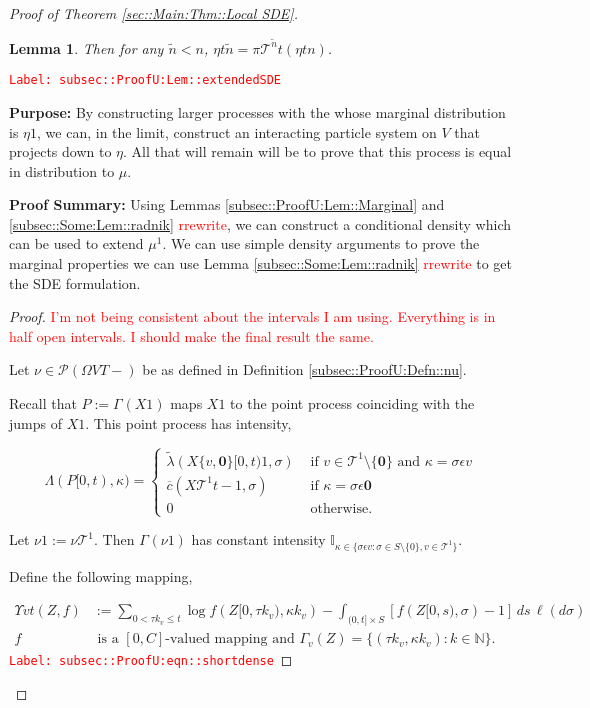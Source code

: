\documentclass[12pt]{article}
\newcommand{\mb}{\mathbb}
\newcommand{\mc}{\mathcal}
\newcommand{\ov}{\overline}
\newcommand{\te}{\text}
\newcommand{\ep}{\epsilon}
\newcommand{\tr}{\textcolor{red}}
\newcommand{\labe}[1]{\tr{\texttt{Label: #1}}}
\newcommand{\purpose}{\textbf{Purpose: }}
\newcommand{\pfsum}{\textbf{Proof Summary: }}
\newcommand{\ind}{\hspace{24pt}}
\newcommand{\defeq}{:=}								%
\newcommand{\pmsr}{\mc{P}}							%
\renewcommand{\root}{\mathbf{0}}				%
\renewcommand{\v}{v}							%
\renewcommand{\S}{S}							%
\newcommand{\s}{\sigma}							%
\newcommand{\ev}{\ep}							%
\newcommand{\T}{T}								%
\renewcommand{\t}{t}							%
\newcommand{\proj}{\pi}							%
\renewcommand{\tt}{s}							%
\newcommand{\X}{X}								%
\newcommand{\const}{C}							%
\newcommand{\IGrg}{\ov{c}}						%
\newcommand{\tree}{\mc{T}}						%
\newcommand{\sln}[1]{^{#1}}						%
\newcommand{\Sm}{\ell}							%
\newcommand{\alt}[1]{\widetilde{#1}}			%
\newcommand{\m}{\mu}							%
\newcommand{\mm}{\nu}							%
\newcommand{\mmm}{\eta}							%
\newcommand{\XXX}{Z}							%
\newcommand{\rt}{\tau}							%
\renewcommand{\it}{k}							%
\newcommand{\pmap}[1]{\Gamma_{#1}}				%
\renewcommand{\mark}{\kappa}					%
\newcommand{\rp}{P}								%
\newcommand{\ratee}{\Lambda}					%
\newcommand{\crate}{\alt{\lambda}}				%
\newcommand{\ds}{\Upsilon}						%
\newtheorem{lem}[thms]{Lemma}
\begin{document}
\begin{proof}[Proof of Theorem \ref{sec::Main:Thm::Local SDE}]
\begin{lem}
Then for any \(\alt{n} < n\), \(\mmm{}{\t}{\alt{n}} = \proj{\tree\sln{\alt{n}}}{\t}(\mmm{}{\t}{n})\).
\label{subsec::ProofU:Lem::extendedSDE}
\end{lem}
\labe{subsec::ProofU:Lem::extendedSDE}

\purpose By constructing larger processes with the whose marginal distribution is \(\mmm{}{}{1}\), we can, in the limit, construct an interacting particle system on \(V\) that projects down to \(\mmm{}{}{}\). All that will remain will be to prove that this process is equal in distribution to \(\m{}{}{}\).

\pfsum Using Lemmas \ref{subsec::ProofU:Lem::Marginal} and \ref{subsec::Some:Lem::radnik} \tr{rrewrite}, we can construct a conditional density which can be used to extend \(\mu\sln{1}\). We can use simple density arguments to prove the marginal properties we can use Lemma \ref{subsec::Some:Lem::radnik} \tr{rrewrite} to get the SDE formulation.

\begin{proof}
\tr{I'm not being consistent about the intervals I am using. Everything is in half open intervals. I should make the final result the same.}

Let \(\mm{}{}{} \in \pmsr(\Omega{ V}{\T-})\) be as defined in Definition \ref{subsec::ProofU:Defn::nu}.

\ind Recall that \(\rp{} \defeq \pmap{}(\X{}{}{1})\) maps \(\X{}{}{1}\) to the point process coinciding with the jumps of \(\X{}{}{1}\). This point process has intensity,

\[\ratee{}(\rp{}[0,\t),\mark{}) = \begin{cases}
\crate{}{}(\X{\{\v,\root\}}{[0,\t)}{1},\s) &\te{ if } \v\in \tree\sln{1}\setminus\{\root\}\te{ and } \mark{} = \s\ev{\v}\\
\IGrg{}(\X{\tree\sln{1}}{\t-}{1},\s) &\te{ if } \mark{} = \s\ev{\root}\\
0 &\te{ otherwise}.
\end{cases}\]

Let \(\mm{}{}{1} \defeq \mm{\tree\sln{1}}{}{}\). Then \(\pmap{}(\mm{}{}{1})\) has constant intensity \(\mb{I}_{\kappa \in\{\s\ev{\v}:\s\in\S\setminus\{0\},\v\in\tree\sln{1}\}}\). 

\ind Define the following mapping,

\begin{align}
\ds{\v}{\t}(\XXX{}{},f) &\defeq \sum_{0 < \rt{\it}_\v \leq \t} \log{f(\XXX{}{[0,\rt{\it}_\v)},\mark{\it}_\v)} - \int_{(0,\t]\times \S} [f(\XXX{}{[0,\tt)},\s) - 1]\,ds\,\Sm(d\s) \label{subsec::ProofU:eqn::shortdense}\\
f&\te{ is a }[0,\const{}] \te{-valued mapping and } \pmap{\v}(\XXX{}{}) = \{(\rt{\it}_\v,\mark{\it}_\v):\it\in\mb{N}\}.\nonumber
\end{align} 
\labe{subsec::ProofU:eqn::shortdense}


\end{proof}
\end{proof}
\end{document}

